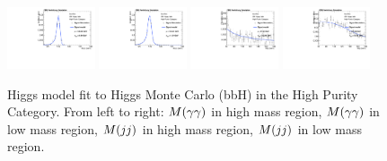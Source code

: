 \begin{figure}[h]
  \centering
\includegraphics[width=0.23\textwidth]{figures/sec-signals/HiggsShapes/bbh_HM_signal_fit_mgg_cat0.pdf}
\includegraphics[width=0.23\textwidth]{figures/sec-signals/HiggsShapes/bbh_LM_signal_fit_mgg_cat0.pdf}
\includegraphics[width=0.23\textwidth]{figures/sec-signals/HiggsShapes/bbh_HM_signal_fit_mjj_cat0.pdf}
\includegraphics[width=0.23\textwidth]{figures/sec-signals/HiggsShapes/bbh_LM_signal_fit_mjj_cat0.pdf}
  \caption{Higgs model fit to Higgs Monte Carlo (bbH) in the High Purity Category. From left to right: $M(\gamma\gamma)$ in high mass region, $M(\gamma\gamma)$ in low mass region, $M(jj)$ in high mass region, $M(jj)$ in low mass region.}
  \label{fig:higgs_fit_bbh}
\end{figure}

